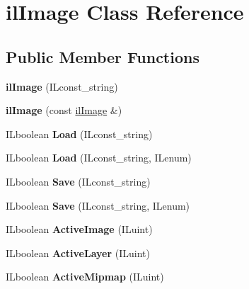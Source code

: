 \hypertarget{classilImage}{}\section{il\+Image Class Reference}
\label{classilImage}
\subsection*{Public Member Functions}
\begin{DoxyCompactItemize}
\item 
\mbox{\label{classilImage_a4dae8e8f0c46a4f0a164d9620d80483e}} 
{\bfseries il\+Image} (I\+Lconst\+\_\+string)
\item 
\mbox{\label{classilImage_a8835ff2785a1287caad2ffd121017cdc}} 
{\bfseries il\+Image} (const \hyperlink{classilImage}{il\+Image} \&)
\item 
\mbox{\label{classilImage_a18d9b04397c6fe5172d80319f028f4da}} 
I\+Lboolean {\bfseries Load} (I\+Lconst\+\_\+string)
\item 
\mbox{\label{classilImage_a5d29f3b14ee2ef87a538395185c323fe}} 
I\+Lboolean {\bfseries Load} (I\+Lconst\+\_\+string, I\+Lenum)
\item 
\mbox{\label{classilImage_a26d16ac972be2d1655d0f4e9803dc025}} 
I\+Lboolean {\bfseries Save} (I\+Lconst\+\_\+string)
\item 
\mbox{\label{classilImage_aa40f7a08c7d46f34b487c08bb7bd38d9}} 
I\+Lboolean {\bfseries Save} (I\+Lconst\+\_\+string, I\+Lenum)
\item 
\mbox{\label{classilImage_a5635938ffee8a3856811e5c51658a0f8}} 
I\+Lboolean {\bfseries Active\+Image} (I\+Luint)
\item 
\mbox{\label{classilImage_a52781721e97af4840259699518ff63d8}} 
I\+Lboolean {\bfseries Active\+Layer} (I\+Luint)
\item 
\mbox{\label{classilImage_a5ee7041f179112a50218964e3d8aab81}} 
I\+Lboolean {\bfseries Active\+Mipmap} (I\+Luint)
\item 

\end{DoxyCompactItemize}

